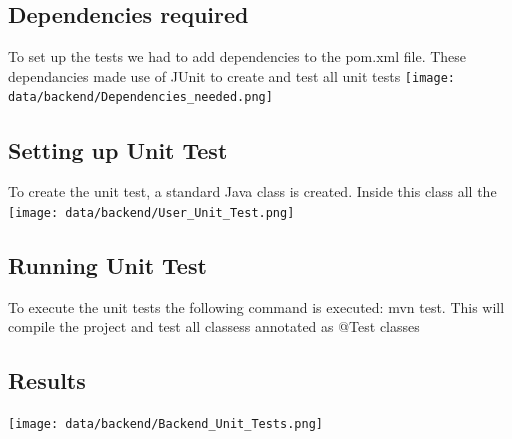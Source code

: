\subsection{Dependencies required}
To set up the tests we had to add dependencies to the pom.xml file. These dependancies made use of JUnit to create and test all unit tests
\texttt{[image: data/backend/Dependencies\_needed.png]}

\subsection{Setting up Unit Test}
To create the unit test, a standard Java class is created. Inside this class all the 
\texttt{[image: data/backend/User\_Unit\_Test.png]}

\subsection{Running Unit Test}
To execute the unit tests the following command is executed: mvn test. This will compile the project and test all classess annotated as @Test classes

\subsection{Results}
\texttt{[image: data/backend/Backend\_Unit\_Tests.png]}
